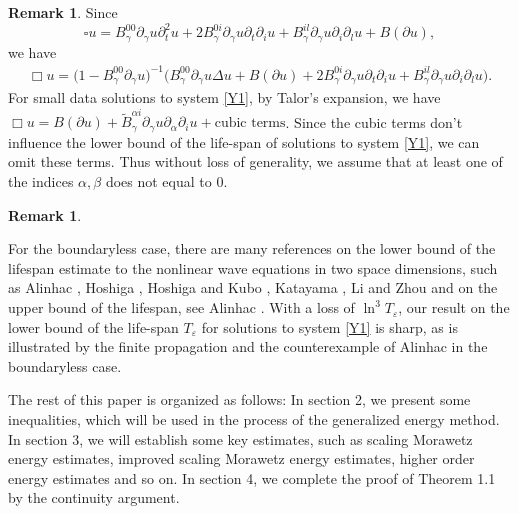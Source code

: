 \documentclass[11pt, reqno]{amsart}
\theoremstyle{definition}
\theoremstyle{remark}
\theoremstyle{definition}
\newtheorem{rem}[thm]{Remark}
\numberwithin{equation}{section}
\numberwithin{equation}{section}
\begin{document}
\begin{rem}\label{rem2}
Since 
\begin{equation*}
\square
u=B_{\gamma}^{00}\partial_{\gamma}u\partial_t^2u+2B_{\gamma}^{0i}\partial_{\gamma}u\partial_t\partial_iu+B_{\gamma}^{il}\partial_{\gamma}u\partial_i\partial_lu+B(\partial
u),
\end{equation*} 
we have
\begin{align*}
\Box
u=\big(1-B_{\gamma}^{00}\partial_{\gamma}u\big)^{-1}\big(B_{\gamma}^{00}\partial_{\gamma}u\Delta
u+B(\partial
u)+2B_{\gamma}^{0i}\partial_{\gamma}u\partial_t\partial_iu+B_{\gamma}^{il}\partial_{\gamma}u\partial_i\partial_lu\big).
\end{align*}
For small data solutions to system \eqref{Y1}, by Talor's expansion,
we have $\Box u=B(\partial u)+\tilde{B}_{\gamma}^{\alpha
i}\partial_{\gamma}u\partial_{\alpha}\partial_iu+\text{cubic
terms}$. Since the cubic terms don't influence the lower bound of
the life-span of solutions to system \eqref{Y1}, we can omit these
terms. Thus without loss of generality, we assume that at least one
of the indices $\alpha,\beta$ does not equal to $0$.
\end{rem}

\begin{rem}\label{rem3}

 For the boundaryless case, there are many references on the lower bound of the lifespan estimate to the nonlinear
wave equations in two space dimensions, such as Alinhac
\cite{Alinhac1}, Hoshiga \cite{Hoshiga1,Hoshiga3}, Hoshiga and Kubo
\cite{Hoshiga2}, Katayama \cite{Katayama}, Li and Zhou
\cite{Li3,Li2} and on the upper bound of the lifespan, see
Alinhac \cite{Alinhac3,Alinhac4,Alinhac2}. With a loss of
$\ln^3T_{\varepsilon}$, our result on the lower bound of the
life-span $T_{\varepsilon}$ for solutions to system \eqref{Y1} is
sharp, as is illustrated by the finite propagation and the
counterexample of Alinhac \cite{Alinhac3,Alinhac4} in the
boundaryless case.
\end{rem}

\par The rest of this paper is organized as follows:
In section 2, we present some inequalities, which will be used in
the process of the generalized energy method. In section 3, we will establish
 some key estimates, such as scaling Morawetz energy
estimates, improved scaling Morawetz energy estimates, higher order energy
estimates and so on. In section 4, we complete the proof of Theorem
1.1 by the continuity argument.
\end{document}
